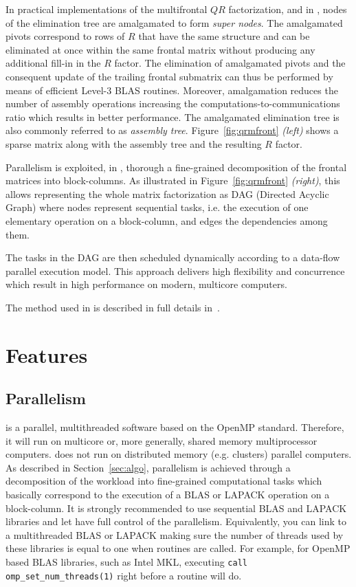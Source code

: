 \documentclass[11pt]{article}
\begin{document}
In practical implementations of the multifrontal $QR$ factorization,
and in \qrm, nodes of the elimination tree are amalgamated to form
{\it super nodes}. The amalgamated pivots correspond to rows of $R$
that have the same structure and can be eliminated at once within the
same frontal matrix without producing any additional fill-in in the
$R$ factor. The elimination of amalgamated pivots and the consequent
update of the trailing frontal submatrix can thus be performed by
means of efficient Level-3 BLAS routines. Moreover, amalgamation
reduces the number of assembly operations increasing the
computations-to-communications ratio which results in better
performance. The amalgamated elimination tree is also commonly
referred to as {\it assembly tree}. Figure~\ref{fig:qrmfront} {\it
  (left)} shows a sparse matrix along with the assembly tree and the
resulting $R$ factor.

Parallelism is exploited, in \qrm, thorough a fine-grained
decomposition of the frontal matrices into block-columns. As
illustrated in Figure~\ref{fig:qrmfront} {\it (right)}, this allows
representing the whole matrix factorization as DAG (Directed Acyclic
Graph) where nodes represent sequential tasks, i.e. the execution of
one elementary operation on a block-column, and edges the dependencies
among them. 

The tasks in the DAG are then scheduled dynamically according to a
data-flow parallel execution model. This approach delivers high
flexibility and concurrence which result in high performance on
modern, multicore computers.  

The method used in \qrm is described in full details
in~\cite{butt:11}. 

\section{Features}
\subsection{Parallelism}
\label{sec:parallelism}
\qrm is a parallel, multithreaded software based on the OpenMP
standard. Therefore, it will run on multicore or, more generally,
shared memory multiprocessor computers. \qrm does not run on
distributed memory (e.g. clusters) parallel computers. As described in
Section~\ref{sec:algo}, parallelism is achieved through a
decomposition of the workload into fine-grained computational tasks
which basically correspond to the execution of a BLAS or LAPACK
operation on a block-column. It is strongly recommended to use
sequential BLAS and LAPACK libraries and let \qrm have full control of
the parallelism. Equivalently, you can link to a multithreaded BLAS or
LAPACK making sure the number of threads used by these libraries is
equal to one when \qrm routines are called. For example, for OpenMP
based BLAS libraries, such as Intel MKL, executing \texttt{call
  omp\_set\_num\_threads(1)} right before a \qrm routine will do.
\end{document}
